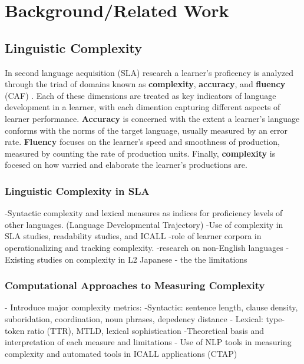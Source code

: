 \chapter{Background/Related Work}

\section{Linguistic Complexity}

In second language acquisition (SLA) research a learner's proficency is analyzed through the triad of domains known
as \textbf{complexity}, \textbf{accuracy}, and \textbf{fluency} (CAF) \cite{Skehan1989,ellis2003}. Each of these
dimensions are treated as key indicators of language development in a learner, with each dimention capturing different
aspects of learner performance. \textbf{Accuracy} is concerned with the extent a learner's language conforms with
the norms of the target language, usually measured by an error rate. \textbf{Fluency} focuses on the learner's speed
and smoothness of production, measured by counting the rate of production units. Finally, \textbf{complexity} is
focesed on how varried and elaborate the learner's productions are.

\subsection{Linguistic Complexity in SLA}
-Syntactic complexity and lexical measures as indices for proficiency levels of other languages. (Language Developmental Trajectory)
-Use of complexity in SLA studies, readability studies, and ICALL
-role of learner corpora in operationalizing and tracking complexity.
-research on non-English languages
-Existing studies on complexity in L2 Japanese - the the limitations


\subsection{Computational Approaches to Measuring Complexity}
- Introduce major complexity metrics:
    -Syntactic: sentence length, clause density, suboridation, coordination, noun phrases, depedency distance
    - Lexical: type-token ratio (TTR), MTLD, lexical sophistication
-Theoretical basis and interpretation of each measure and limitations
- Use of NLP tools in measuring complexity and automated tools in ICALL applications (CTAP)

